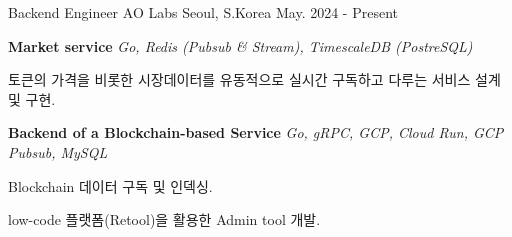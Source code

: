 

\begin{cventries}
  \cventry
  {Backend Engineer} %
  {AO Labs} %
  {Seoul, S.Korea} %
  {May. 2024 - Present} %
  {
      \begin{cvitems} %
        \item[] {\textbf{Market service} \hspace{1cm} \textit{Go, Redis (Pubsub \& Stream), TimescaleDB (PostreSQL)}}
        \item {토큰의 가격을 비롯한 시장데이터를 유동적으로 실시간 구독하고 다루는 서비스 설계 및 구현.}
        \item[] 
        \item[] {\textbf{Backend of a Blockchain-based Service} \hspace{1cm} \textit{Go, gRPC, GCP, Cloud Run, GCP Pubsub, MySQL}}
        \item {Blockchain 데이터 구독 및 인덱싱.}
        \item {low-code 플랫폼(Retool)을 활용한 Admin tool 개발.}
      \end{cvitems}
  }
  

\end{cventries}
